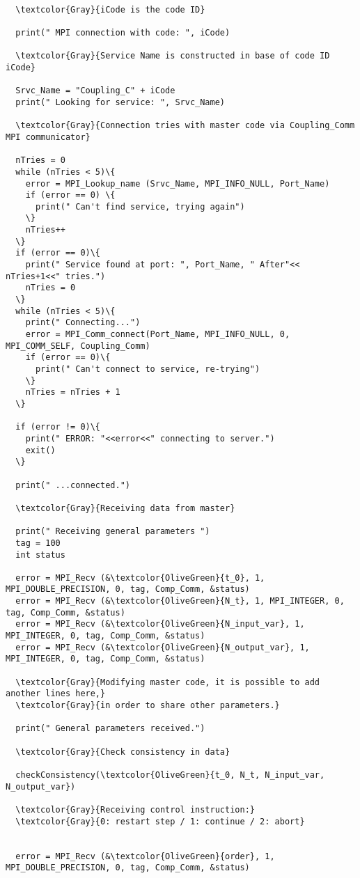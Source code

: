 \begin{Verbatim}[frame=single,commandchars=\\\{\}]

  \textcolor{Gray}{iCode is the code ID}
  
  print(" MPI connection with code: ", iCode)

  \textcolor{Gray}{Service Name is constructed in base of code ID iCode}
  
  Srvc_Name = "Coupling_C" + iCode
  print(" Looking for service: ", Srvc_Name)

  \textcolor{Gray}{Connection tries with master code via Coupling_Comm MPI communicator}
  
  nTries = 0
  while (nTries < 5)\{
    error = MPI_Lookup_name (Srvc_Name, MPI_INFO_NULL, Port_Name)
    if (error == 0) \{
      print(" Can't find service, trying again")
    \}
    nTries++
  \}
  if (error == 0)\{
    print(" Service found at port: ", Port_Name, " After"<< nTries+1<<" tries.")
    nTries = 0
  \}
  while (nTries < 5)\{
    print(" Connecting...")
    error = MPI_Comm_connect(Port_Name, MPI_INFO_NULL, 0, MPI_COMM_SELF, Coupling_Comm)
    if (error == 0)\{
      print(" Can't connect to service, re-trying")
    \}
    nTries = nTries + 1
  \}

  if (error != 0)\{
    print(" ERROR: "<<error<<" connecting to server.")
    exit()
  \}

  print(" ...connected.")

  \textcolor{Gray}{Receiving data from master}

  print(" Receiving general parameters ")  
  tag = 100
  int status
  
  error = MPI_Recv (&\textcolor{OliveGreen}{t_0}, 1, MPI_DOUBLE_PRECISION, 0, tag, Comp_Comm, &status)
  error = MPI_Recv (&\textcolor{OliveGreen}{N_t}, 1, MPI_INTEGER, 0, tag, Comp_Comm, &status)
  error = MPI_Recv (&\textcolor{OliveGreen}{N_input_var}, 1, MPI_INTEGER, 0, tag, Comp_Comm, &status)
  error = MPI_Recv (&\textcolor{OliveGreen}{N_output_var}, 1, MPI_INTEGER, 0, tag, Comp_Comm, &status)

  \textcolor{Gray}{Modifying master code, it is possible to add another lines here,}
  \textcolor{Gray}{in order to share other parameters.}    
    
  print(" General parameters received.")

  \textcolor{Gray}{Check consistency in data}

  checkConsistency(\textcolor{OliveGreen}{t_0, N_t, N_input_var, N_output_var})
  
  \textcolor{Gray}{Receiving control instruction:}
  \textcolor{Gray}{0: restart step / 1: continue / 2: abort}


  error = MPI_Recv (&\textcolor{OliveGreen}{order}, 1, MPI_DOUBLE_PRECISION, 0, tag, Comp_Comm, &status)

\end{Verbatim}


